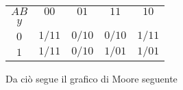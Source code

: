 \documentclass[a4paper]{extarticle}
\renewcommand\arraystretch{}
\begin{document}
\vspace{1em}
\noindent
\begin{table}[H]
\setlength{\tabcolsep}{4pt}
\renewcommand{\arraystretch}{1.2}
\centering
    \begin{tabular}{c|c|c|c|c|}
        $AB$ & $00$ & $01$ & $11$ & $10$\\
        $y$  &      &      &      &\\
        \hline
        $0$  & $1/11$ & \cellcolor{orange!25!white}$0/10$ & \cellcolor{orange!25!white}$0/10$ & $1/11$\\
        \hline
        $1$  & \cellcolor{orange!25!white}$1/11$ & $0/10$ & \cellcolor{orange!25!white}$1/01$ & \cellcolor{orange!25!white}$1/01$\\
    \end{tabular}
\end{table}

\vspace{1em}
\noindent
Da ciò segue il grafico di Moore seguente
\end{document}
